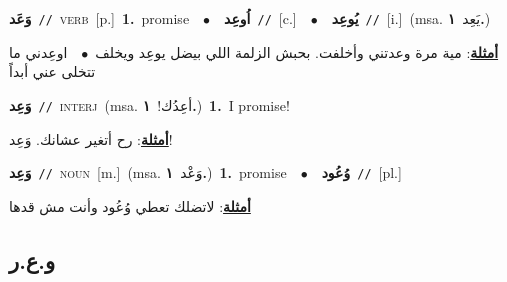 \documentclass[10pt,a4paper,twoside]{article} %
\begin{document}
\begin{multicols}{2}
{\setlength\topsep{0pt}\textbf{\foreignlanguage{arabic}{وَعَد}}\ {\color{gray}\texttt{//}\color{black}}\ \textsc{verb}\ [p.]\ \textbf{1.}~promise\ \ $\bullet$\ \ \setlength\topsep{0pt}\textbf{\foreignlanguage{arabic}{اُوعِد}}\ {\color{gray}\texttt{//}\color{black}}\ [c.]\ \ $\bullet$\ \ \setlength\topsep{0pt}\textbf{\foreignlanguage{arabic}{يُوعِد}}\ {\color{gray}\texttt{//}\color{black}}\ [i.]\ \color{gray}(msa. \foreignlanguage{arabic}{يَعِد}~\foreignlanguage{arabic}{\textbf{١.}})\color{black}\  \begin{flushright}\color{gray}\foreignlanguage{arabic}{\textbf{\underline{\foreignlanguage{arabic}{أمثلة}}}: مية مرة وعدتني وأخلفت. بحبش الزلمة اللي بيضل يوعِد ويخلف\ $\bullet$\ \  اوعِدني ما تتخلى عني أبداً}\end{flushright}\color{black}} \vspace{2mm}

{\setlength\topsep{0pt}\textbf{\foreignlanguage{arabic}{وَعِد}}\ {\color{gray}\texttt{//}\color{black}}\ \textsc{interj}\ \color{gray}(msa. \foreignlanguage{arabic}{أعِدُك!}~\foreignlanguage{arabic}{\textbf{١.}})\color{black}\ \textbf{1.}~I promise!\  \begin{flushright}\color{gray}\foreignlanguage{arabic}{\textbf{\underline{\foreignlanguage{arabic}{أمثلة}}}: رح أتغير عشانك. وَعِد!}\end{flushright}\color{black}} \vspace{2mm}

{\setlength\topsep{0pt}\textbf{\foreignlanguage{arabic}{وَعِد}}\ {\color{gray}\texttt{//}\color{black}}\ \textsc{noun}\ [m.]\ \color{gray}(msa. \foreignlanguage{arabic}{وَعْد}~\foreignlanguage{arabic}{\textbf{١.}})\color{black}\ \textbf{1.}~promise\ \ $\bullet$\ \ \setlength\topsep{0pt}\textbf{\foreignlanguage{arabic}{وُعُود}}\ {\color{gray}\texttt{//}\color{black}}\ [pl.]\  \begin{flushright}\color{gray}\foreignlanguage{arabic}{\textbf{\underline{\foreignlanguage{arabic}{أمثلة}}}: لاتضلك تعطي وُعُود وأنت مش قدها}\end{flushright}\color{black}} \vspace{2mm}

\vspace{-3mm}
\subsection*{\color{blue}\foreignlanguage{arabic}{و.ع.ر}\color{blue}{}} 


\end{multicols}
\end{document}
